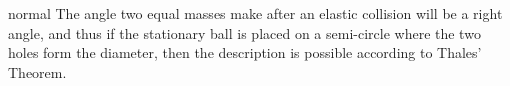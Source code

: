 \begin{solution}{normal}
The angle two equal masses make after an elastic collision will be a right angle, and thus if the stationary ball is placed on a semi-circle where the two holes form the diameter, then the description is possible according to Thales' Theorem.
\end{solution}
